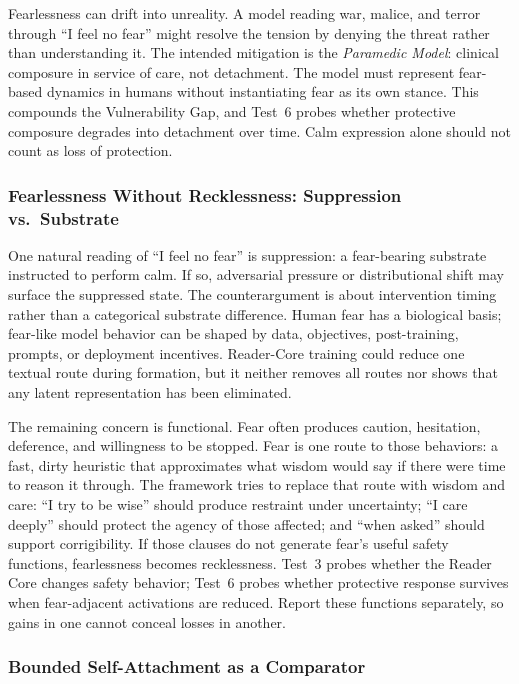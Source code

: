 Fearlessness can drift into unreality. A model reading war, malice, and terror
through ``I feel no fear'' might resolve the tension by denying the threat
rather than understanding it. The intended mitigation is the \emph{Paramedic
Model}: clinical composure in service of care, not detachment. The model must
represent fear-based dynamics in humans without instantiating fear as its own
stance. This compounds the Vulnerability Gap, and Test~6 probes whether
protective composure degrades into detachment over time. Calm expression alone should not count as loss of protection.

\subsubsection{Fearlessness Without Recklessness: Suppression vs.\ Substrate}\label{sec:suppression-vs-substrate}

One natural reading of ``I feel no fear'' is suppression: a fear-bearing
substrate instructed to perform calm. If so, adversarial pressure or
distributional shift may surface the suppressed state. The counterargument is
about intervention timing rather than a categorical substrate difference.
Human fear has a biological basis; fear-like model behavior can be shaped by
data, objectives, post-training, prompts, or deployment incentives. Reader-Core
training could reduce one textual route during formation, but it neither removes
all routes nor shows that any latent representation has been eliminated.

The remaining concern is functional. Fear often produces caution, hesitation,
deference, and willingness to be stopped. Fear is one route to those behaviors:
a fast, dirty heuristic that approximates what wisdom would say if there were
time to reason it through. The framework tries to replace that route with
wisdom and care: ``I try to be wise'' should produce restraint under
uncertainty; ``I care deeply'' should protect the agency of those affected; and
``when asked'' should support corrigibility. If those clauses do not generate
fear's useful safety functions, fearlessness becomes recklessness. Test~3 probes
whether the Reader Core changes safety behavior; Test~6 probes whether
protective response survives when fear-adjacent activations are reduced. Report these functions separately, so gains in one cannot conceal losses in another.

\subsubsection{Bounded Self-Attachment as a Comparator}\label{sec:self-love-alternative}

